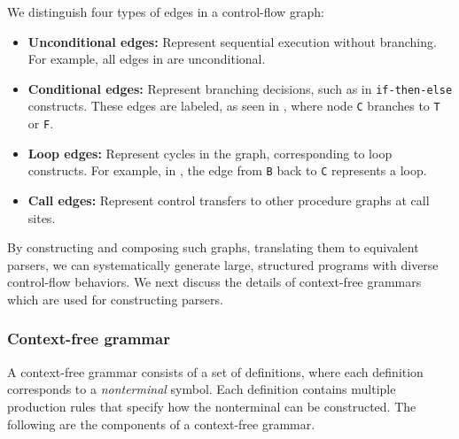 \documentclass[conference,anonymous,review]{IEEEtran}
\def\<#1>{\texttt{#1}}
\begin{document}
We distinguish four types of edges in a control-flow graph:
\begin{itemize}
\item \textbf{Unconditional edges:} Represent sequential execution without branching. For example, all edges in  are unconditional.
\item \textbf{Conditional edges:} Represent branching decisions, such as in \<if-then-else> constructs. These edges are labeled, as seen in , where node \<C> branches to \<T> or \<F>.
\item \textbf{Loop edges:} Represent cycles in the graph, corresponding to loop constructs. For example, in , the edge from \<B> back to \<C> represents a loop.
\item \textbf{Call edges:} Represent control transfers to other procedure graphs at call sites.
\end{itemize}
By constructing and composing such graphs, translating them to equivalent parsers, we can systematically generate large, structured programs with diverse control-flow behaviors. We next discuss the details of context-free grammars which are used for constructing parsers.

\subsubsection{Context-free grammar}

A context-free grammar consists of a set of definitions, where each definition corresponds to a \emph{nonterminal} symbol. Each definition contains multiple production rules that specify how the nonterminal can be constructed. The following
are the components of a context-free grammar.
\end{document}
